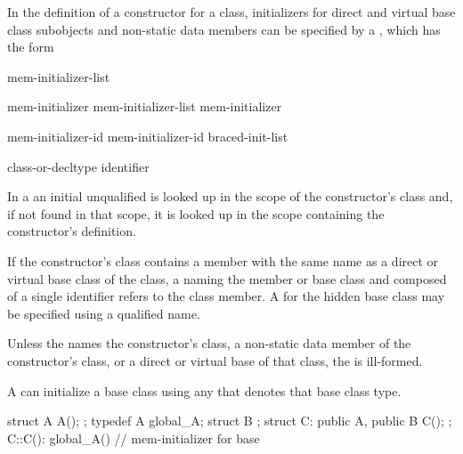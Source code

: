 \pnum
In the definition of a constructor for a class,
initializers for direct and virtual base class subobjects and
non-static data members can be specified by a
,
which has the form

\begin{bnf}
\br
    \terminal{:} mem-initializer-list
\end{bnf}

\begin{bnf}
\br
    mem-initializer \br
    mem-initializer-list \terminal{,} mem-initializer 
\end{bnf}

\begin{bnf}
\br
    mem-initializer-id \terminal{(}  \terminal{)}\br
    mem-initializer-id braced-init-list
\end{bnf}

\begin{bnf}
\br
    class-or-decltype\br
    identifier
\end{bnf}

\pnum
In a  an initial unqualified
 is looked up in the scope of the constructor's class
and, if not found in that scope, it is looked up in the scope containing the
constructor's definition.
\begin{note}
If the constructor's class contains a member with the same name as a direct
or virtual base class of the class, a
naming the member or base class and composed of a single identifier
refers to the class member.
A
for the hidden base class may be specified using a qualified name.
\end{note}
Unless the
names the constructor's class,
a non-static data member of the constructor's class, or
a direct or virtual base of that class,
the
is ill-formed.

\pnum
A
can initialize a base class using any  that denotes that base class type.
\begin{example}
\begin{codeblock}
struct A { A(); };
typedef A global_A;
struct B { };
struct C: public A, public B { C(); };
C::C(): global_A() { }          // mem-initializer for base 
\end{codeblock}
\end{example}

